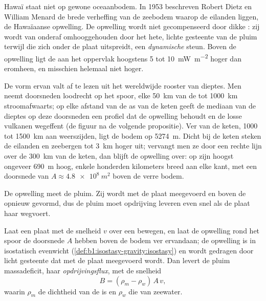 Hawaï staat niet op gewone oceaanbodem. In 1953 beschreven Robert Dietz en William Menard de brede verheffing van de zeebodem waarop de eilanden liggen, de Hawaïaanse opwelling. De opwelling wordt niet gecompenseerd door dikke : zij wordt van onderaf omhooggehouden door het hete, lichte gesteente van de pluim terwijl die zich onder de plaat uitspreidt, een \emph{dynamische} steun. Boven de opwelling ligt de  aan het oppervlak hoogstens 5 tot \qty{10}{mW.m^{-2}} hoger dan eromheen, en misschien helemaal niet hoger.

De vorm ervan valt af te lezen uit het wereldwijde rooster van dieptes. Men neemt doorsneden loodrecht op het spoor, elke \qty{50}{km} van de  tot \qty{1000}{km} stroomafwaarts; op elke afstand van de as van de keten geeft de mediaan van de dieptes op deze doorsneden een profiel dat de opwelling behoudt en de losse vulkanen wegeffent (de figuur na de volgende propositie). Ver van de keten, 1000 tot \qty{1500}{km} aan weerszijden, ligt de bodem op \qty{5274}{m}. Dicht bij de keten steken de eilanden en zeebergen tot \qty{3}{km} hoger uit; vervangt men ze door een rechte lijn over de \qty{300}{km} van de keten, dan blijft de opwelling over: op zijn hoogst ongeveer \qty{690}{m} hoog, enkele honderden kilometers breed aan elke kant, met een doorsnede van $A \approx \qty{4.8e8}{m^2}$ boven de verre bodem.

De opwelling meet de pluim. Zij wordt met de plaat meegevoerd en boven de  opnieuw gevormd, dus de pluim moet opdrijving leveren even snel als de plaat haar wegvoert.

\begin{proposition}\label{prop:b1:hotspots:buoyancy}
Laat een plaat met de snelheid $v$ over een  bewegen, en laat de opwelling rond het spoor de doorsnede $A$ hebben boven de bodem ver ervandaan; de opwelling is in isostatisch evenwicht (\cref{def:b1:isostasy-gravity:isostasy}) en wordt gedragen door licht gesteente dat met de plaat meegevoerd wordt. Dan levert de pluim massadeficit, haar \emph{opdrijvingsflux}, met de snelheid
\[
  B = (\rho_m - \rho_w)\,A\,v ,
\]
waarin $\rho_m$ de dichtheid van de  is en $\rho_w$ die van zeewater.
\end{proposition}

